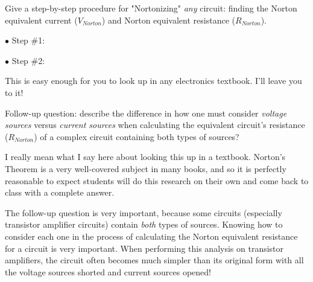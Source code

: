 

Give a step-by-step procedure for "Nortonizing" {\it any} circuit: finding the Norton equivalent current ($V_{Norton}$) and Norton equivalent resistance ($R_{Norton}$).

\medskip
\goodbreak
\item{$\bullet$} Step \#1:
\vskip 5pt
\item{$\bullet$} Step \#2:
\medskip







This is easy enough for you to look up in any electronics textbook.  I'll leave you to it!

\vskip 10pt

Follow-up question: describe the difference in how one must consider {\it voltage sources} versus {\it current sources} when calculating the equivalent circuit's resistance ($R_{Norton}$) of a complex circuit containing both types of sources?







I really mean what I say here about looking this up in a textbook.  Norton's Theorem is a very well-covered subject in many books, and so it is perfectly reasonable to expect students will do this research on their own and come back to class with a complete answer.

The follow-up question is very important, because some circuits (especially transistor amplifier circuits) contain {\it both} types of sources.  Knowing how to consider each one in the process of calculating the Norton equivalent resistance for a circuit is very important.  When performing this analysis on transistor amplifiers, the circuit often becomes much simpler than its original form with all the voltage sources shorted and current sources opened!




